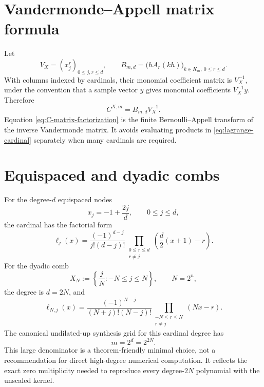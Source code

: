 \documentclass[11pt,oneside]{book}
\theoremstyle{definition}
\theoremstyle{remark}
\newcommand{\set}[1]{\left\{#1\right\}}
\begin{document}
\section{Vandermonde--Appell matrix formula}
Let
\begin{equation}
 V_X=(x_j^r)_{0\le j,r\le d},
 \qquad
 B_{m,d}=\bigl(hA_r(kh)\bigr)_{k\in K_m,\ 0\le r\le d}.
 \label{eq:V-B-matrices}
\end{equation}
With columns indexed by cardinals, their monomial coefficient matrix is \(V_X^{-1}\), under the convention that a sample vector \(y\) gives monomial coefficients \(V_X^{-1}y\).  Therefore
\begin{equation}
 C^{X,m}=B_{m,d}V_X^{-1}.
 \label{eq:C-matrix-factorization}
\end{equation}
Equation \cref{eq:C-matrix-factorization} is the finite Bernoulli--Appell transform of the inverse Vandermonde matrix.  It avoids evaluating products in \cref{eq:lagrange-cardinal} separately when many cardinals are required.

\section{Equispaced and dyadic combs}
For the degree-\(d\) equispaced nodes
\[
 x_j=-1+\frac{2j}{d},\qquad 0\le j\le d,
\]
the cardinal has the factorial form
\begin{equation}
 \ell_j(x)=
 \frac{(-1)^{d-j}}{j!(d-j)!}
 \prod_{\substack{0\le r\le d\\r\ne j}}
 \left(\frac d2(x+1)-r\right).
 \label{eq:equispaced-cardinal}
\end{equation}
For the dyadic comb
\begin{equation}
 X_N:=\set{\frac{j}{N}:-N\le j\le N},
 \qquad N=2^n,
 \label{eq:dyadic-comb}
\end{equation}
the degree is \(d=2N\), and
\begin{equation}
 \ell_{N,j}(x)=
 \frac{(-1)^{N-j}}{(N+j)!(N-j)!}
 \prod_{\substack{-N\le r\le N\\r\ne j}}(Nx-r).
 \label{eq:dyadic-cardinal}
\end{equation}
The canonical undilated-up synthesis grid for this cardinal degree has
\begin{equation}
 m=2^d=2^{2N}.
 \label{eq:double-exponential-m}
\end{equation}
This large denominator is a theorem-friendly minimal choice, not a recommendation for direct high-degree numerical computation.  It reflects the exact zero multiplicity needed to reproduce every degree-\(2N\) polynomial with the unscaled kernel.
\end{document}
